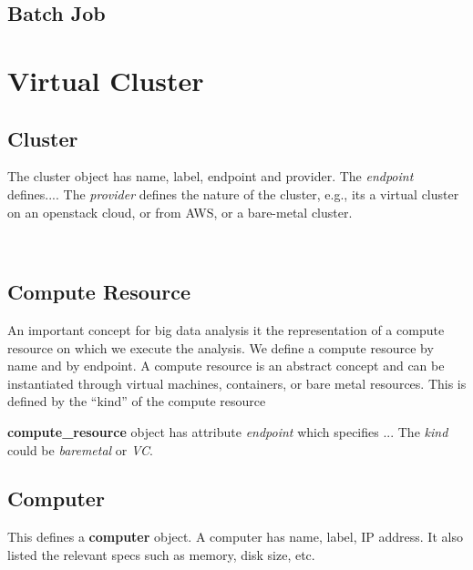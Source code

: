 \documentclass[9pt,twocolumn,twoside]{styles/osajnl}
\begin{document}
\subsection{Batch Job}


\section{Virtual Cluster}

\subsection{Cluster}

The cluster object has name, label, endpoint and provider. The
\textit{endpoint} defines....  The \textit{provider} defines the
nature of the cluster, e.g., its a virtual cluster on an openstack
cloud, or from AWS, or a bare-metal cluster.


\
\subsection{Compute Resource}

An important concept for big data analysis it the representation of a
compute resource on which we execute the analysis. We define a compute
resource by name and by endpoint. A compute resource is an abstract
concept and can be instantiated through virtual machines, containers,
or bare metal resources. This is defined by the “kind” of the compute
resource 

\textbf{compute\_resource} object has attribute \textit{endpoint} which
specifies ... The \textit{kind} could be \textit{baremetal} or \textit{VC}.


\subsection{Computer}

This defines a \textbf{computer} object. A computer has name, label,
IP address. It also listed the relevant specs such as memory, disk
size, etc.
\end{document}
